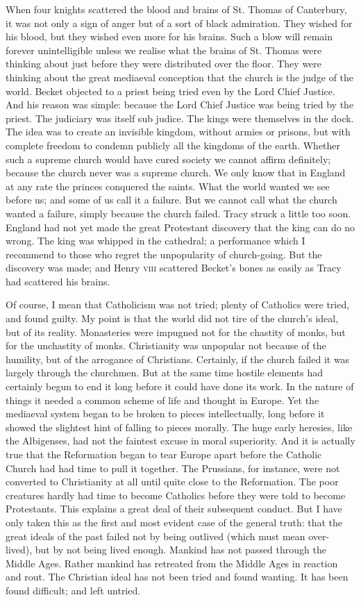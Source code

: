\documentclass[final,10pt,letterpaper,twocolumn,openany]{book}
\begin{document}
When four knights scattered the blood and brains of St. Thomas of
Canterbury, it was not only a sign of anger but of a sort of black
admiration. They wished for his blood, but they wished even more for his
brains. Such a blow will remain forever unintelligible unless we realise
what the brains of St. Thomas were thinking about just before they were
distributed over the floor. They were thinking about the great mediaeval
conception that the church is the judge of the world. Becket objected to a
priest being tried even by the Lord Chief Justice. And his reason was
simple: because the Lord Chief Justice was being tried by the priest. The
judiciary was itself sub judice. The kings were themselves in the dock.
The idea was to create an invisible kingdom, without armies or prisons,
but with complete freedom to condemn publicly all the kingdoms of the
earth. Whether such a supreme church would have cured society we
cannot affirm definitely; because the church never was a supreme church.
We only know that in England at any rate the princes conquered the saints.
What the world wanted we see before us; and some of us call it a failure.
But we cannot call what the church wanted a failure, simply because the
church failed. Tracy struck a little too soon. England had not yet made the
great Protestant discovery that the king can do no wrong. The king was
whipped in the cathedral; a performance which I recommend to those who
regret the unpopularity of church-going. But the discovery was made; and
Henry \textsc{viii} scattered Becket's bones as easily as Tracy had scattered his
brains.

Of course, I mean that Catholicism was not tried; plenty of Catholics
were tried, and found guilty. My point is that the world did not tire of the
church's ideal, but of its reality. Monasteries were impugned not for the
chastity of monks, but for the unchastity of monks. Christianity was
unpopular not because of the humility, but of the arrogance of Christians.
Certainly, if the church failed it was largely through the churchmen. But at
the same time hostile elements had certainly begun to end it long before it
could have done its work. In the nature of things it needed a common
scheme of life and thought in Europe. Yet the mediaeval system began to
be broken to pieces intellectually, long before it showed the slightest hint
of falling to pieces morally. The huge early heresies, like the Albigenses,
had not the faintest excuse in moral superiority. And it is actually true that
the Reformation began to tear Europe apart before the Catholic Church
had had time to pull it together. The Prussians, for instance, were not
converted to Christianity at all until quite close to the Reformation. The
poor creatures hardly had time to become Catholics before they were told
to become Protestants. This explains a great deal of their subsequent
conduct. But I have only taken this as the first and most evident case of the
general truth: that the great ideals of the past failed not by being outlived
(which must mean over-lived), but by not being lived enough. Mankind
has not passed through the Middle Ages. Rather mankind has retreated
from the Middle Ages in reaction and rout. The Christian ideal has not
been tried and found wanting. It has been found difficult; and left untried.
\end{document}
